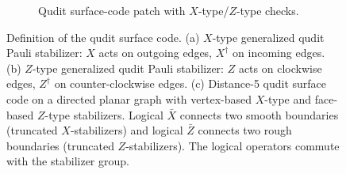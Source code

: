 \begin{figure}[H]
\begin{minipage}[t]{0.62\textwidth}
\begin{subfigure}[t]{\linewidth}
      \caption{Qudit surface-code patch with $X$-type/$Z$-type checks.}
      \label{fig:patch}
    \end{subfigure}
  \end{minipage}

  \caption{Definition of the qudit surface code.
  (a) $X$-type generalized qudit Pauli stabilizer: $X$ acts on outgoing edges, $X^\dagger$ on incoming edges.
  (b) $Z$-type generalized qudit Pauli stabilizer: $Z$ acts on clockwise edges, $Z^\dagger$ on counter-clockwise edges.
  (c) Distance-5 qudit surface code on a directed planar graph with vertex-based $X$-type and face-based $Z$-type stabilizers. Logical $\bar{X}$ connects two smooth boundaries (truncated $X$-stabilizers) and logical $\bar{Z}$ connects two rough boundaries (truncated $Z$-stabilizers). The logical operators commute with the stabilizer group.}
  \label{fig:qudit-surface-code}
\end{figure}

